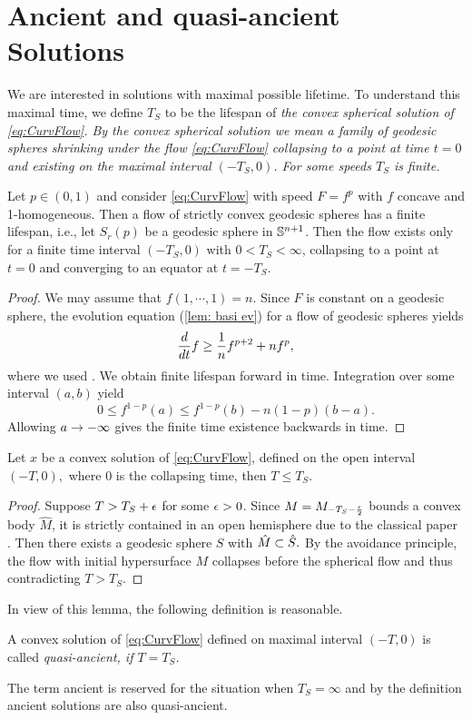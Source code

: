 \documentclass{amsart}
\begin{document}
\section{Ancient and quasi-ancient Solutions}\label{quasi}
We are interested in solutions with maximal possible lifetime. To understand this maximal time, we define $T_S$ to be the lifespan of \it{the} convex spherical solution of \eqref{eq:CurvFlow}. By the convex spherical solution we mean a family of geodesic spheres shrinking under the flow \eqref{eq:CurvFlow} collapsing to a point at time $t=0$ and existing on the maximal interval \((-T_S, 0)\). For some speeds \(T_S\) is finite.
\begin{lemma}
 Let $p\in(0,1)$ and consider \eqref{eq:CurvFlow} with speed \(F = f^p\) with \(f\) concave and 1-homogeneous. Then a flow of strictly convex geodesic spheres has a finite lifespan, i.e., let $S_r(p)$ be a geodesic sphere in $\S^{n+1}$. Then the flow exists only for a finite time interval \((-T_S,0)\) with \(0 < T_S < \infty\), collapsing to a point at \(t=0\) and converging to an equator at \(t=-T_S\).
\end{lemma}
\begin{proof}
We may assume that $f(1,\cdots,1)=n.$
Since $F$ is constant on a geodesic sphere, the evolution equation (\ref{lem: basi ev}) for a flow of geodesic spheres yields
$$\fr{d}{dt}f\geq \fr 1n f^{p+2}+ nf^{p},$$
where we used \cite[Lemma~2.2.19, Lemma~2.2.20]{Gerhardt:/2006}.
We obtain finite lifespan forward in time. Integration over some interval $(a,b)$ yield
$$0\leq f^{1-p}(a)\leq f^{1-p}(b)-n(1-p)(b-a).$$
Allowing $a\ra-\8$ gives the finite time existence backwards in time.
\end{proof}
\begin{lemma}
Let $x$ be a convex solution of \eqref{eq:CurvFlow}, defined on the open interval $(-T,0),$ where $0$ is the collapsing time, then $T\leq T_S.$
\end{lemma}
\begin{proof}
Suppose $T>T_S+\e$ for some $\e>0$. Since $M=M_{-T_S-\fr{\e}{2}}$ bounds a convex body $\hat{M}$, it is strictly contained in an open hemisphere due to the classical paper \cite{CarmoWarner:/1970}. Then there exists a geodesic sphere $S$ with $\hat{M}\sub\hat{S}.$ By the avoidance principle, the flow with initial hypersurface $M$ collapses before the spherical flow and thus contradicting $T>T_S$.
\end{proof}
In view of this lemma, the following definition is reasonable.
\begin{defn}
A convex solution of \eqref{eq:CurvFlow} defined on maximal interval $(-T,0)$ is called \it{quasi-ancient}, if $T=T_S$.
\end{defn}
The term ancient is reserved for the situation when \(T_S=\infty\) and by the definition ancient solutions are also quasi-ancient.
\end{document}
